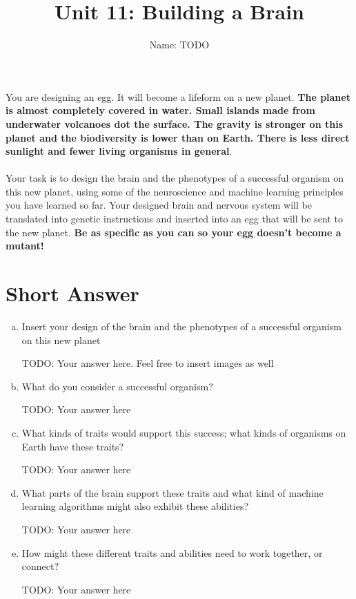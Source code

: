 \documentclass[letterpaper,11pt]{article}
\begin{document}
\title{{\bf Unit 11: Building a Brain} }
\author{Name: TODO}

\date{}
\maketitle

You are designing an egg. It will become a lifeform on a new planet. \textbf{The planet is almost completely covered in water. Small islands made from underwater volcanoes dot the surface. The gravity is stronger on this planet and the biodiversity is lower than on Earth. There is less direct sunlight and fewer living organisms in general}. 
\\\\
Your task is to design the brain and the phenotypes of a successful organism on this new planet, using some of the neuroscience and machine learning principles you have learned so far. Your designed brain and nervous system will be translated into genetic instructions and inserted into an egg that will be sent to the new planet. \textbf{Be as specific as you can so your egg doesn’t become a mutant!}


\section*{Short Answer}
\begin{enumerate}[a)]
\item Insert your design of the brain and the phenotypes of a successful organism on this new planet

\begin{tcolorbox}
TODO: Your answer here.  Feel free to insert images as well
\end{tcolorbox}

\item What do you consider a successful organism?

\begin{tcolorbox}
TODO: Your answer here
\end{tcolorbox}

\item What kinds of traits would support this success; what kinds of organisms on Earth have these traits?

\begin{tcolorbox}
TODO: Your answer here
\end{tcolorbox}

\item What parts of the brain support these traits and what kind of machine learning algorithms might also exhibit these abilities?

\begin{tcolorbox}
TODO: Your answer here
\end{tcolorbox}

\item How might these different traits and abilities need to work together, or connect?

\begin{tcolorbox}
TODO: Your answer here
\end{tcolorbox}
    
\end{enumerate}
\end{document}

